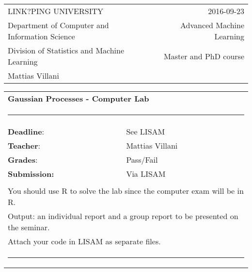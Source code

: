 \documentclass[11pt,english]{article}\usepackage[]{graphicx}\usepackage[]{color}
\providecommand{\tabularnewline}{\\}
\begin{document}
\noindent \begin{flushleft}
\begin{tabular}{llr}
LINK?PING UNIVERSITY &
 &
2016-09-23\tabularnewline
Department of Computer and Information Science &
\hspace{2cm} &
Advanced Machine Learning\tabularnewline
Division of Statistics and Machine Learning &
 &
Master and PhD course\tabularnewline
Mattias Villani &
 &
\tabularnewline
\end{tabular}
\par\end{flushleft}

\vspace{0.3cm}

\noindent \begin{flushleft}
\begin{tabular}{ll}
\multicolumn{2}{l}{\textbf{\large{}Gaussian Processes - Computer Lab}}\tabularnewline
\multicolumn{2}{l}{\rule{0.975\columnwidth}{1pt}}\tabularnewline
\textbf{Deadline}: &
See LISAM\tabularnewline
\textbf{Teacher}: &
Mattias Villani\tabularnewline
\textbf{Grades}: &
Pass/Fail\tabularnewline
\textbf{Submission:} &
Via LISAM\tabularnewline
 &
\tabularnewline
\multicolumn{2}{l}{You should use R to solve the lab since the computer exam will be
in R.}\tabularnewline
\multicolumn{2}{l}{Output: an individual report and a group report to be presented on
the seminar.}\tabularnewline
\multicolumn{2}{l}{Attach your code in LISAM as separate files.}\tabularnewline
\multicolumn{2}{l}{\rule{0.975\columnwidth}{1pt}}\tabularnewline
\end{tabular}
\par\end{flushleft}

\vspace{0.3cm}
\end{document}
